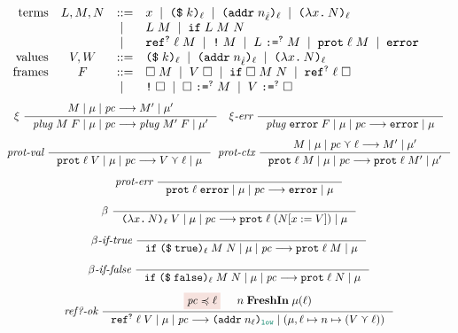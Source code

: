 \begin{figure}[tbp]
  \raggedright
  {\small \[
  \begin{array}{rcll}
    \text{terms}  & L , M , N & ::=  & x \;\mid\; \text{\texttt{{(\$}}}\;{k}\text{\texttt{{)}}}_{\ell} \;\mid\; \text{\texttt{{(addr}}}\;{n_{\hat{\ell}}}\text{\texttt{{)}}}_{\ell} \;\mid\; \text{\texttt{{(${\lambda}$}}}{x}\text{\texttt{{.}}}\,{N}\text{\texttt{{)}}}_{\ell} \\
                           &  & \;\mid\; & L \; M \;\mid\; \text{\texttt{{if}}}\;{L}\;{M}\;{N} \\
                           &  & \;\mid\; & \text{\texttt{{ref}}}^{\text{\texttt{{?}}}}\;{\ell}\;{M} \;\mid\; \text{\texttt{{!}}}\;{M} \;\mid\; {L}\;\text{\texttt{{:=}}}^{\text{\texttt{{?}}}}\;{M} \;\mid\; \text{\texttt{{prot}}}\;{\ell}\;{M} \;\mid\; \mathtt{error} \\
    \text{values}     & V, W     & ::=  & \text{\texttt{{(\$}}}\;{k}\text{\texttt{{)}}}_{\ell} \;\mid\; \text{\texttt{{(addr}}}\;{n_{\hat{\ell}}}\text{\texttt{{)}}}_{\ell} \;\mid\; \text{\texttt{{(${\lambda}$}}}{x}\text{\texttt{{.}}}\,{N}\text{\texttt{{)}}}_{\ell} \\
    \text{frames} & F & ::= & \Box\;M \;\mid\; V\;\Box \;\mid\; \text{\texttt{{if}}}\;{\Box}\;{M}\;{N} \;\mid\; \text{\texttt{{ref}}}^{\text{\texttt{{?}}}}\;{\ell}\;{\Box} \\
                          & & \;\mid\; & \text{\texttt{{!}}}\;{\Box} \;\mid\; {\Box}\;\text{\texttt{{:=}}}^{\text{\texttt{{?}}}}\;{M} \;\mid\; {V}\;\text{\texttt{{:=}}}^{\text{\texttt{{?}}}}\;{\Box}
  \end{array}
  \]}
  {\small
  \begin{gather*}
  \xi~
  \inference
  {\reduce{M}{\mu}{\pc}{M'}{\mu'}}
  {\reduce{\mathit{plug}\;M\;F}{\mu}{\pc}{\mathit{plug}\;M'\;F}{\mu'}}
  \quad
  \xi\textit{-err}~
  \inference{}{\reduce{\mathit{plug}\;\key{error}\;F}{\mu}{\pc}{\key{error}}{\mu}}
  \\[1ex]
  \textit{prot-val}~
  \inference{}{\reduce{\dynprot{\ell}{V}}{\mu}{\pc}{V \curlyvee \ell}{\mu}}
  \;\;
  \textit{prot-ctx}~
  \inference
  {\reduce{M}{\mu}{\pc \curlyvee \ell}{M'}{\mu'}}
  {\reduce{\dynprot{\ell}{M}}{\mu}{\pc}{\dynprot{\ell}{M'}}{\mu'}}
  \\[1ex]
  \textit{prot-err}~
  \inference{}{\reduce{\dynprot{\ell}{\key{error}}}{\mu}{\pc}{\key{error}}{\mu}}
  \\[1ex]
  \beta~
  \inference{}{\reduce{\dynlam{x}{N}{\ell} \; V}{\mu}{\pc}{\dynprot{\ell}{(N [x := V])}}{\mu}}
  \\[1ex]
  \beta\textit{-if-true}~
  \inference{}{\reduce{\dynif{\dynconst{\true}{\ell}}{M}{N}}{\mu}{\pc}{\dynprot{\ell}{M}}{\mu}}
  \\[1ex]
  \beta\textit{-if-false}~
  \inference{}{\reduce{\dynif{\dynconst{\false}{\ell}}{M}{N}}{\mu}{\pc}{\dynprot{\ell}{N}}{\mu}}
  \\[1ex]
  \textit{ref?-ok}~
  \inference
  {\highlightred{\pc \preccurlyeq \ell} & n \; \mathbf{FreshIn} \; \mu(\ell)}
  {\reduce{\dynref{?}{\ell}{V}}{\mu}{\pc}{\dynaddr{n_{\ell}}{\low}}{(\mu, \ell \mapsto n \mapsto (V \curlyvee \ell))}}

\end{gather*}}
\end{figure}
